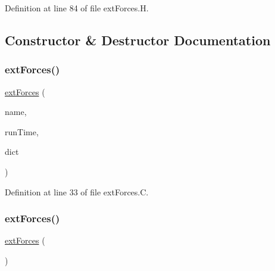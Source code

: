 Definition at line 84 of file ext\+Forces.\+H.



\subsection{Constructor \& Destructor Documentation}
\mbox{\label{classFoam_1_1externalIOObject_1_1extForces_a193309988b550c6f60d518e73d5be84d}} 
\subsubsection{\texorpdfstring{ext\+Forces()}{extForces()}\hspace{0.1cm}{\footnotesize\ttfamily [1/2]}}
{\footnotesize\ttfamily \hyperlink{classFoam_1_1externalIOObject_1_1extForces}{ext\+Forces} (\begin{DoxyParamCaption}\item[{const word \&}]{name,  }\item[{const Time \&}]{run\+Time,  }\item[{const dictionary \&}]{dict }\end{DoxyParamCaption})}



Definition at line 33 of file ext\+Forces.\+C.

\mbox{\label{classFoam_1_1externalIOObject_1_1extForces_a2edaedc8560a065327ee61119b526f30}} 
\subsubsection{\texorpdfstring{ext\+Forces()}{extForces()}\hspace{0.1cm}{\footnotesize\ttfamily [2/2]}}
{\footnotesize\ttfamily \hyperlink{classFoam_1_1externalIOObject_1_1extForces}{ext\+Forces} (\begin{DoxyParamCaption}\item[{const \hyperlink{classFoam_1_1externalIOObject_1_1extForces}{ext\+Forces} \&}]{ }\end{DoxyParamCaption})\hspace{0.3cm}{\ttfamily [delete]}}

